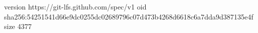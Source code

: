 version https://git-lfs.github.com/spec/v1
oid sha256:54251541d66e9dc0255dc02689796c07d473b4268d6618c6a7dda9d387135e4f
size 4377
